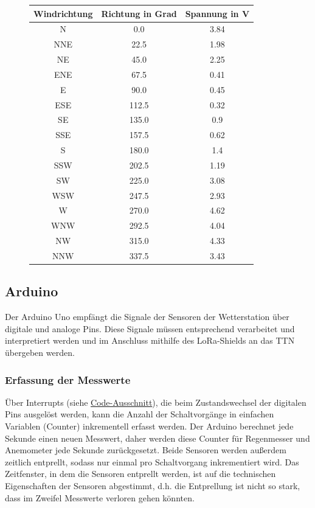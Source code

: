 \documentclass[12pt]{article}
\begin{document}
        \begin{figure}[H] \label{wind_vane_table}
          \centering
          \begin{tabular}[h]{c|c|c}
            Windrichtung & Richtung in Grad & Spannung in V \\
            \hline
            N & 0.0 & 3.84 \\
            NNE & 22.5 & 1.98 \\
            NE & 45.0 & 2.25 \\
            ENE & 67.5 & 0.41 \\
            E & 90.0 & 0.45 \\
            ESE & 112.5 & 0.32 \\
            SE & 135.0 & 0.9 \\
            SSE & 157.5 & 0.62 \\
            S & 180.0 & 1.4 \\
            SSW & 202.5 & 1.19 \\
            SW & 225.0 & 3.08 \\
            WSW & 247.5 & 2.93 \\
            W & 270.0 & 4.62 \\
            WNW & 292.5 & 4.04 \\
            NW & 315.0 & 4.33 \\
            NNW & 337.5 & 3.43 \\
          \end{tabular}
        \end{figure}



      \subsection{Arduino}
        Der Arduino Uno empfängt die Signale der Sensoren der Wetterstation über digitale und analoge Pins.
        Diese Signale müssen entsprechend verarbeitet und interpretiert werden und im Anschluss mithilfe des LoRa-Shields an das TTN übergeben werden.
        


      \subsubsection{Erfassung der Messwerte}
      Über Interrupts (siehe \href{https://github.com/HTWDD-RN/LoRaWAN-Wetterstation-SEN-15901/blob/21bf650ae923dba30d39e37641f77aa94702a314/src/lora_weather_station/lora_weather_station.ino#L176}{Code-Ausschnitt}), die beim Zustandswechsel der digitalen Pins ausgelöst werden, kann die Anzahl der Schaltvorgänge in einfachen Variablen (Counter) inkrementell erfasst werden.
      Der Arduino berechnet jede Sekunde einen neuen Messwert, daher werden diese Counter für Regenmesser und Anemometer jede Sekunde zurückgesetzt.
      Beide Sensoren werden außerdem zeitlich entprellt, sodass nur einmal pro Schaltvorgang inkrementiert wird.
      Das Zeitfenster, in dem die Sensoren entprellt werden, ist auf die technischen Eigenschaften der Sensoren abgestimmt, d.h. die Entprellung ist nicht so stark, dass im Zweifel Messwerte verloren gehen könnten.
\end{document}
